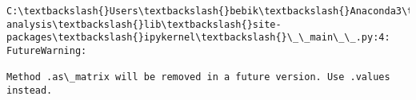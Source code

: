 \documentclass[11pt]{article}
\begin{document}
    \begin{Verbatim}[commandchars=\\\{\}]
C:\textbackslash{}Users\textbackslash{}bebik\textbackslash{}Anaconda3\textbackslash{}envs\textbackslash{}crypto-analysis\textbackslash{}lib\textbackslash{}site-packages\textbackslash{}ipykernel\textbackslash{}\_\_main\_\_.py:4: FutureWarning:

Method .as\_matrix will be removed in a future version. Use .values instead.


    \end{Verbatim}

    
    

    
    
    
    
\end{document}
